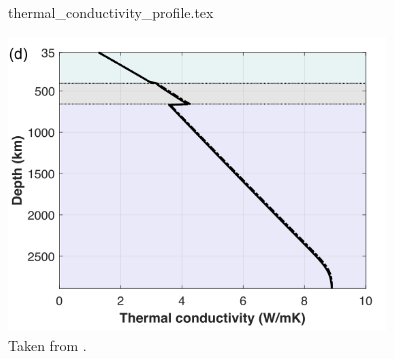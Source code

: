 \begin{flushright} {\tiny {\color{gray} thermal\_conductivity\_profile.tex}} \end{flushright}

\begin{center}
\includegraphics[width=10cm]{images/thermal_conductivity/nemi23}\\
{\captionfont Taken from \textcite{nemi23}.}
\end{center}
